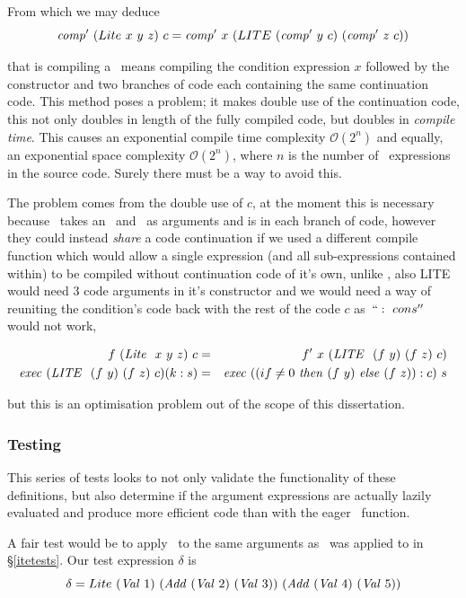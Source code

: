 \documentclass {article}
\begin{document}
From which we may deduce 
\[ \Compp  (Lite\ x\ y\ z)\ c 
		= \Compp  x\ (LITE\ (\Compp  y\ c)\ (\Compp  z\ c)) \]
		
\noindent that is compiling a \lite\ 
means compiling the condition expression $x$
followed by the \LITEt constructor and two
branches of code each containing the same
continuation code.
This method poses a problem;
it makes double use of the continuation code,
this not only doubles in length of the fully compiled code,
but doubles in \emph{compile time}.
This causes an exponential
 compile time complexity 
\( \mathcal{O}(2^n) \)
and equally, an exponential space complexity
\( \mathcal{O}(2^n) \),
where $n$ is the number of \lite\ expressions 
in the source code.
Surely there must be a way to avoid this.

The problem comes from the double use of $c$,
at the moment this is necessary because \compp\
takes an \expr\ and \code\ as arguments and is in
each branch of code,
however they could instead \emph{share}
a code continuation if we used a different compile function
which would allow a single expression 
(and all sub-expressions contained within)  
to be compiled without continuation code of it's own,
unlike \compp, also LITE would need 3 code arguments in
it's constructor and we would need a way of 
reuniting the condition's code back with the rest of the code $c$
as~$``:\ cons''$ would not work,

\begin{eqnarray*}
f\ (\mathit{Lite\ }\ x\ y\ z)\ c &=& f'\ x\ (\mathit{LITE\ }\ (f\ y)\ (f\ z)\ c) \\
\mathit{exec\ } (\mathit{LITE\ }\ (f\ y)\ (f\ z)\ c) (k : s) 
&=& \mathit{exec\ } ((if \not=0\ \mathit{then\ } (f\ y)\ \mathit{else\ } (f\ z)) : c)\ s 
\end{eqnarray*}

\noindent but this is an optimisation problem 
out of the scope of this dissertation.


\subsubsection{Testing}

This series of tests looks to not only
validate the functionality of these
definitions, but also determine
if the argument expressions are actually lazily evaluated
and produce more efficient code than with the eager
\ite\ function.

A fair test would be to apply \lite\ to 
the same arguments as \ite\ was applied to 
in \S\ref{itetests}. 
Our test expression $\delta$ is
\[ \delta = Lite\ (\Val 1)\
		 (\Add (\Val 2)\ (\Val 3))\ 
		(\Add (\Val 4)\ (\Val 5)) \]
\end{document}
